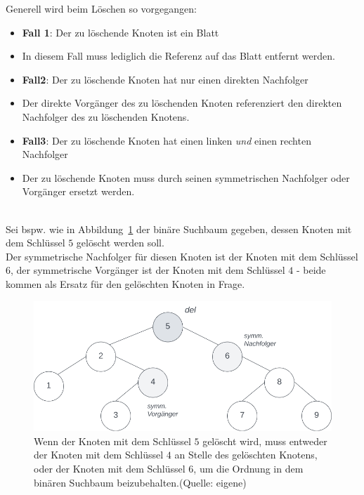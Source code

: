 \noindent
Generell wird beim Löschen so vorgegangen:

\begin{itemize}
    \item \textbf{Fall 1}: Der zu löschende Knoten ist ein Blatt
    \item [] In diesem Fall muss lediglich die Referenz auf das Blatt entfernt werden.
    \item \textbf{Fall2}: Der zu löschende Knoten hat nur einen direkten Nachfolger
    \item[] Der direkte Vorgänger des zu löschenden Knoten referenziert den direkten Nachfolger des zu löschenden Knotens.
    \item \textbf{Fall3}: Der zu löschende Knoten hat einen linken \textit{und} einen rechten Nachfolger
    \item[] Der zu löschende Knoten muss durch seinen symmetrischen Nachfolger oder Vorgänger ersetzt werden.
\end{itemize}\\


\noindent
Sei bspw. wie in Abbildung~\ref{fig:deltree} der binäre Suchbaum gegeben, dessen Knoten mit dem Schlüssel $5$ gelöscht werden soll.\\
Der symmetrische Nachfolger für diesen Knoten ist der Knoten mit dem Schlüssel $6$, der symmetrische Vorgänger ist der Knoten mit dem Schlüssel $4$ - beide kommen als Ersatz für den gelöschten Knoten in Frage.\\

\begin{figure}
    \begin{center}
        \includegraphics[scale=0.4]{chapters/Datenstrukturen und Algorithmen/img/deltree}
        \caption{Wenn der Knoten mit dem Schlüssel $5$ gelöscht wird, muss entweder der  Knoten mit dem Schlüssel $4$ an Stelle des gelöschten Knotens, oder der Knoten mit dem Schlüssel $6$, um die Ordnung in dem binären Suchbaum beizubehalten.(Quelle: eigene)}
        \label{fig:deltree}
    \end{center}
\end{figure}

